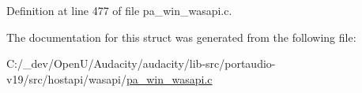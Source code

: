 Definition at line 477 of file pa\+\_\+win\+\_\+wasapi.\+c.



The documentation for this struct was generated from the following file\+:\begin{DoxyCompactItemize}
\item 
C\+:/\+\_\+dev/\+Open\+U/\+Audacity/audacity/lib-\/src/portaudio-\/v19/src/hostapi/wasapi/\hyperlink{pa__win__wasapi_8c}{pa\+\_\+win\+\_\+wasapi.\+c}\end{DoxyCompactItemize}
